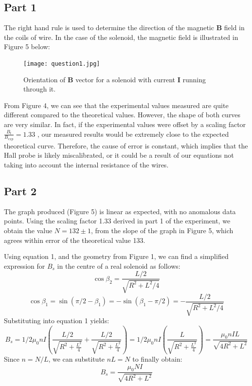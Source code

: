 \documentclass[letterpaper]{article}
\begin{document}
\subsection{Part 1}

The right hand rule is used to determine the
direction of the magnetic $\textbf{B}$ field in the coils of wire. In the case of the
solenoid, the magnetic field is illustrated in Figure 5 below:

\begin{figure}[H]
 \centering
 \texttt{[image: question1.jpg]}
 \caption{Orientation of \textbf{B} vector for a solenoid with current \textbf{I} running through it.}
\end{figure}

From Figure 4, we can see that the experimental values measured are quite different
compared to the theoretical values. However, the shape of both curves are very similar.
In fact, if the experimental values were offset by a scaling factor $\frac{B_t}{B_{exp}}=1.33$ , our
measured results would be extremely close to the expected theoretical curve. Therefore,
the cause of error is constant, which implies that the Hall probe is likely miscalibrated,
or it could be a result of our equations not taking into account the internal resistance of the wires.



\subsection{Part 2}


The graph produced (Figure 5) is linear as expected, with no anomalous data points.
Using the scaling factor 1.33 derived in part 1 of the experiment, we obtain the value $N=132 \pm 1$,
from the slope of the graph in Figure 5, which agrees within error of the theoretical value 133.



Using equation 1, and the geometry from Figure 1, we can find a simplified expression for $B_s$ in the centre of a real solenoid as follows:
$$ \cos{\beta_2} = \frac{L/2}{\sqrt{R^2+L^2/4}}$$
$$ \cos{\beta_1} = \sin{(\pi/2 - \beta_1)} = -\sin{(\beta_1-\pi/2)} = -\frac{L/2}{\sqrt{R^2+L^2/4}}  $$
Substituting into equation 1 yields:
$$ B_s = 1/2 \mu_0nI \left(\frac{L/2}{\sqrt{R^2+\frac{L^2}{4}}} + \frac{L/2}{\sqrt{R^2+\frac{L^2}{4}}} \right) =  1/2\mu_0nI \left(\frac{L}{\sqrt{R^2+\frac{L^2}{4}}} \right)= \frac{\mu_0nIL}{\sqrt{4R^2+L^2}}$$
Since $n=N/L$, we can substitute $nL=N$ to finally obtain:
$$ B_s= \frac{\mu_0NI}{\sqrt{4R^2+L^2}} $$
\end{document}
